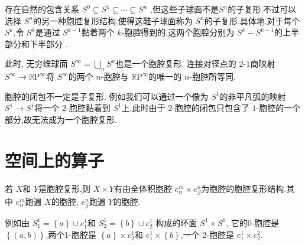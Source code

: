 \documentclass[../../几何与拓扑.tex]{subfiles}
\begin{document}
\begin{example}
    存在自然的包含关系 \(  S^{0}\subseteq S^{1}\subseteq \cdots \subseteq S^{n}  \) ,但这些子球面不是\(  S^{n}  \)的子复形.不过可以选择 \(  S^{n}  \)的另一种胞腔复形结构,使得这鞋子球面称为 \(  S^{n}  \)的子复形.具体地,对于每个 \(  S^{k}  \),令 \(  S^{k}  \)是通过 \(  S^{k-1}  \)黏着两个 \(  k  \)-胞腔得到的,这两个胞腔分别为 \(  S^{k}-S^{k-1}  \)的上半部分和下半部分 .       

    此时, 无穷维球面 \(  S^{\infty}= \bigcup  _{n}S^{n}  \)也是一个胞腔复形. 连接对径点的 2-1商映射 \(  S^{\infty}\to \mathbb{R} \mathrm{P}^{\infty}  \)将 \(  S^{\infty}  \)的两个 \(  n  \)-胞腔与 \(  \mathbb{R} \mathrm{P}^{\infty}  \)的唯一的 \(  n  \)-胞腔所等同.      
\end{example}

\hspace*{\fill} 

\begin{example}
    胞腔的闭包不一定是子复形. 例如我们可以通过一个像为 \(  S^{1}  \)的非平凡弧的映射 \(  S^{1}\to S^{1}  \)将一个 \(  2  \)-胞腔黏着到 \(  S^{1}  \)上,此时由于 \(  2  \)-胞腔的闭包只包含了 \(  1  \)-胞腔的一个部分,故无法成为一个胞腔复形.       
\end{example}

\hspace*{\fill} 

\section{空间上的算子}

\begin{proposition}
    若 \(  X  \)和 \(  Y  \)是胞腔复形,则 \(  X\times Y  \)有由全体积胞腔 \(  e_{\alpha }^{m}\times e_{\beta }^{n}  \)为胞腔的胞腔复形结构.其中 \(  e_{\alpha }^{m}  \)跑遍 \(  X  \)的胞腔, \(  e_{\beta }^{n}  \)跑遍 \(  Y  \)的胞腔.        
\end{proposition}

\begin{example}

    例如由 \(  S_1^{1}= \left\{ a \right\}\cup e_1^{1} \)和 \(  S_2^{1}  = \left\{ b \right\}\cup e_2^{1}\)   构成的环面 \(  S^{1}\times S^{1}  \), 
    它的0-胞腔是 \(  \left\{ \left( a,b \right)  \right\}  \),两个1-胞腔是 \(  \left\{ a \right\}\times e_2^{1}  \)和 \(  e_1^{1}\times \left\{ b \right\}  \),一个 2-胞腔是 \(  e_1^{1}\times e_2^{2}  \).    
    
\end{example}
\end{document}
